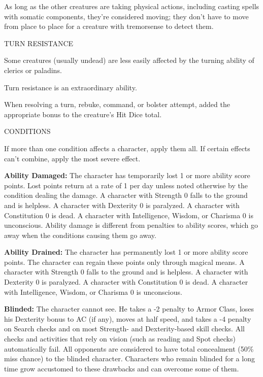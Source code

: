 \documentclass{article}
\begin{document}
As long as the other creatures are taking physical actions, including casting spells 
with somatic components, they're considered moving; they don't have to move from 
place to place for a creature with tremorsense to detect them.

\vspace{12pt}
TURN RESISTANCE

Some creatures (usually undead) are less easily affected by the turning ability 
of clerics or paladins.

Turn resistance is an extraordinary ability.

When resolving a turn, rebuke, command, or bolster attempt, added the appropriate 
bonus to the creature's Hit Dice total. 

\vspace{12pt}
{\LARGE{}CONDITIONS}

If more than one condition affects a character, apply them all. If certain effects 
can't combine, apply the most severe effect.

\vspace{12pt}
\textbf{Ability Damaged:} The character has temporarily lost 1 or more ability 
score points. Lost points return at a rate of 1 per day unless noted otherwise 
by the condition dealing the damage. A character with Strength 0 falls to the ground 
and is helpless. A character with Dexterity 0 is paralyzed. A character with Constitution 
0 is dead. A character with Intelligence, Wisdom, or Charisma 0 is unconscious. 
Ability damage is different from penalties to ability scores, which go away when 
the conditions causing them go away.

\vspace{12pt}
\textbf{Ability Drained:} The character has permanently lost 1 or more ability 
score points. The character can regain these points only through magical means. 
A character with Strength 0 falls to the ground and is helpless. A character with 
Dexterity 0 is paralyzed. A character with Constitution 0 is dead. A character 
with Intelligence, Wisdom, or Charisma 0 is unconscious. 

\vspace{12pt}
\textbf{Blinded:} The character cannot see. He takes a -2 penalty to Armor Class, 
loses his Dexterity bonus to AC (if any), moves at half speed, and takes a -4 penalty 
on Search checks and on most Strength- and Dexterity-based skill checks. All checks 
and activities that rely on vision (such as reading and Spot checks) automatically 
fail. All opponents are considered to have total concealment (50\% miss chance) 
to the blinded character. Characters who remain blinded for a long time grow accustomed 
to these drawbacks and can overcome some of them.
\end{document}
